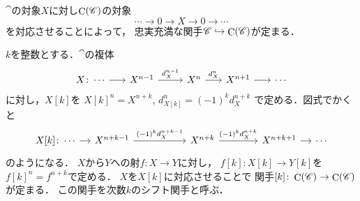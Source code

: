 $\cat$の対象$X$に対し$\mathop{\mathrm{C}}\nolimits(\mathscr{C})$の対象
\begin{equation*}
    \cdots\to
    0\rightarrow
    X\rightarrow
    0\to\cdots
\end{equation*}
を対応させることによって，
忠実充満な関手$\mathscr{C}\hookrightarrow\mathop{\mathrm{C}}\nolimits(\mathscr{C})$が定まる．

$k$を整数とする．$\cat$の複体
\begin{equation*}
    \begin{tikzcd}[column sep=0.6cm]
        X\colon\cdots
        \arrow[r]
        &
        X^{n-1}
        \arrow[r,"d_X^{n-1}"] 
        &[+0.3cm]%
        X^n
        \arrow[r,"d_X^{n}"]
        &%
        X^{n+1}
        \arrow[r, ""] 
        &%
        \cdots
    \end{tikzcd}
\end{equation*}
に対し，$X[k]$を
$X[k]^n=X^{n+k}$, $d_{X[k]}^n=(-1)^{k}d_X^{n+k}$
で定める．図式でかくと
\begin{equation*}
    \begin{tikzcd}[column sep=1.4cm]
        X[k]\colon\cdots
        \arrow[r]
        &[-1cm]
        X^{n+k-1}
        \arrow[r,"(-1)^kd_X^{n+k-1}"] 
        &[+0.5cm]%
        X^{n+k}
        \arrow[r,"(-1)^kd_X^{n+k}"]
        &%
        X^{n+k+1}
        \arrow[r, ""] 
        &[-1cm]%
        \cdots
    \end{tikzcd}
\end{equation*}
のようになる．
$X$から$Y$への射$f\colon X\to Y$に対し，
$f[k]\colon X[k]\to Y[k]$を$f[k]^n=f^{n+k}$で定める．
$X$を$X[k]$に対応させることで
関手$[k]\colon\mathop{\mathrm{C}}\nolimits(\mathscr{C})\to\mathop{\mathrm{C}}\nolimits(\mathscr{C})$が定まる．
この関手を次数$k$のシフト関手と呼ぶ．

